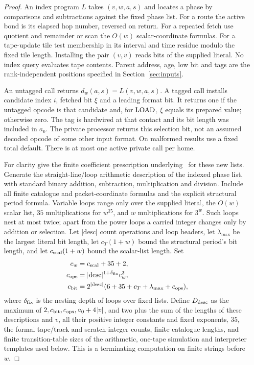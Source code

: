 \begin{proof}
An index program $L$ takes $(v,w,a,s)$ and locates a phase by comparisons and subtractions against the fixed phase list. For a route the active bond is its elapsed hop number, reversed on return. For a repeated fetch use quotient and remainder or scan the $O(w)$ scalar-coordinate formulas. For a tape-update tile test membership in its interval and time residue modulo the fixed tile length. Installing the pair $(v,v)$ reads bits of the supplied literal. No index query evaluates tape contents. Parent address, age, low bit and tags are the rank-independent positions specified in Section~\ref{sec:inputs}.

An untagged call returns $d_w(a,s)=L(v,w,a,s)$. A tagged call installs candidate index $i$, fetched bit $\xi$ and a leading format bit. It returns one if the untagged opcode is that candidate and, for $\operatorname{LOAD}$, $\xi$ equals its prepared value; otherwise zero. The tag is hardwired at that contact and its bit length was included in $a_0$. The private processor returns this selection bit, not an assumed decoded opcode of some other input format. On malformed results use a fixed total default. There is at most one active private call per home.

For clarity give the finite coefficient prescription underlying~\cite[Lemma~13.5]{DMMemory2026} for these new lists. Generate the straight-line/loop arithmetic description of the indexed phase list, with standard binary addition, subtraction, multiplication and division. Include all finite catalogue and packet-coordinate formulas and the explicit structural period formula. Variable loops range only over the supplied literal, the $O(w)$ scalar list, $35$ multiplications for $w^{35}$, and $w$ multiplications for $3^w$. Such loops nest at most twice; apart from the power loops a carried integer changes only by addition or selection. Let $|\mathrm{desc}|$ count operations and loop headers, let $\lambda_{\max}$ be the largest literal bit length, let $c_T(1+w)$ bound the structural period's bit length, and let $c_{\rm scal}(1+w)$ bound the scalar-list length. Set
\[
\begin{split}
 c_w&=c_{\rm scal}+35+2,\\
 c_{\rm ops}&=|\mathrm{desc}|^{1+\delta_{\rm fix}}c_w^2,\\
 c_{\rm bit}&=2^{|\mathrm{desc}|}
 (6+35+c_T+\lambda_{\max}+c_{\rm ops}),
\end{split}
\]
where $\delta_{\rm fix}$ is the nesting depth of loops over fixed lists. Define $D_{\rm desc}$ as the maximum of $2,c_{\rm bit},c_{\rm ops},a_0+4|v|$, and two plus the sum of the lengths of these descriptions and $v$, all their positive integer constants and fixed exponents, $35$, the formal tape/track and scratch-integer counts, finite catalogue lengths, and finite transition-table sizes of the arithmetic, one-tape simulation and interpreter templates used below. This is a terminating computation on finite strings before $w$.


\end{proof}
